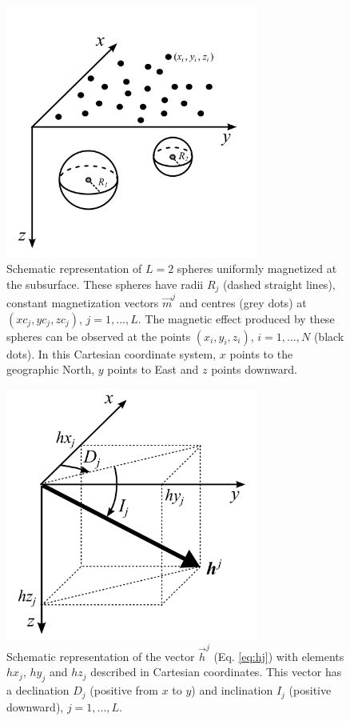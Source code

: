 \documentclass[journal abbreviation, npg]{copernicus}
\begin{document}

\begin{figure}[t]
\vspace*{2mm}
\begin{center}
\includegraphics[width=8.3cm]{Figures/Fig1.png}
\end{center}
\caption{Schematic representation of $L = 2$ spheres uniformly magnetized at the subsurface. These spheres have radii $R_{j}$ (dashed straight lines), constant magnetization vectors $\vec{m}^{j}$ and centres (grey dots) at $(xc_{j}, yc_{j}, zc_{j})$, $j = 1, ..., L$. The magnetic effect produced by these spheres can be observed at the points $(x_{i}, y_{i}, z_{i})$, $i = 1, ..., N$ (black dots). In this Cartesian coordinate system, $x$ points to the geographic North, $y$ points to East and $z$ points downward.}
\label{fig:geometric-aspects}
\end{figure}

\begin{figure}[t]
\vspace*{2mm}
\begin{center}
\includegraphics[width=8.3cm]{Figures/Fig2.png}
\end{center}
\caption{Schematic representation of the vector $\vec{h}^{j}$ (Eq. \ref{eq:hj}) with elements $hx_{j}$, $hy_{j}$ and $hz_{j}$ described in Cartesian coordinates. This vector has a declination $D_{j}$ (positive from $x$ to $y$) and inclination $I_{j}$ (positive downward), $j = 1, ..., L$.}
\label{fig:spherical-coordinates}
\end{figure}
\end{document}
